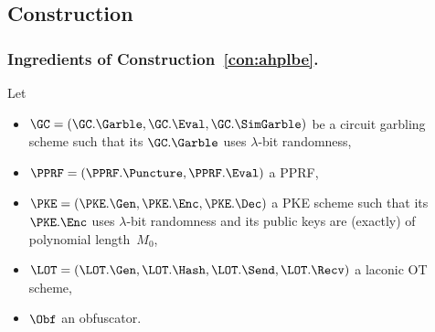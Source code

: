 \subsection{Construction}\label{sec:ahplbe-construction}

\subsubsection{Ingredients of Construction~\ref{con:ahplbe}.}
Let
\begin{itemize}
\item ${\GC=(\GC.\Garble,\GC.\Eval,\GC.\SimGarble)}$ be a circuit garbling scheme
such that its $\GC.\Garble$ uses $\lambda$-bit randomness,
\item ${\PPRF=(\PPRF.\Puncture,\PPRF.\Eval)}$ a PPRF,
\item ${\PKE=(\PKE.\Gen,\PKE.\Enc,\PKE.\Dec)}$ a PKE scheme
such that its $\PKE.\Enc$ uses $\lambda$-bit randomness and
its public keys are (exactly) of polynomial length~$M_0$,
\item ${\LOT=(\LOT.\Gen,\LOT.\Hash,\LOT.\Send,\LOT.\Recv)}$ a laconic OT scheme,
\item $\Obf$ an obfuscator.
\end{itemize}

